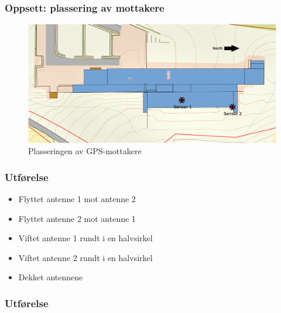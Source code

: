\documentclass[xcolor=table]{beamer}
\begin{document}
\begin{frame}
\frametitle{Oppsett: plassering av mottakere}
      \begin{figure}
        \includegraphics[scale=0.18]{thesis/graphics/roof.eps}
        \caption{Plasseringen av GPS-mottakere}
      \end{figure}
\end{frame}

\begin{frame}
\frametitle{Utførelse}
      \begin{itemize}
            \setlength\itemsep{2em}
        \item Flyttet antenne 1 mot antenne 2
        \item Flyttet antenne 2 mot antenne 1
        \item Viftet antenne 1 rundt i en halvsirkel
        \item Viftet antenne 2 rundt i en halvsirkel
        \item Dekket antennene
      \end{itemize}
\end{frame}

\begin{frame}
\frametitle{Utførelse}
\begin{center}
\end{center}
\end{frame}
\end{document}
